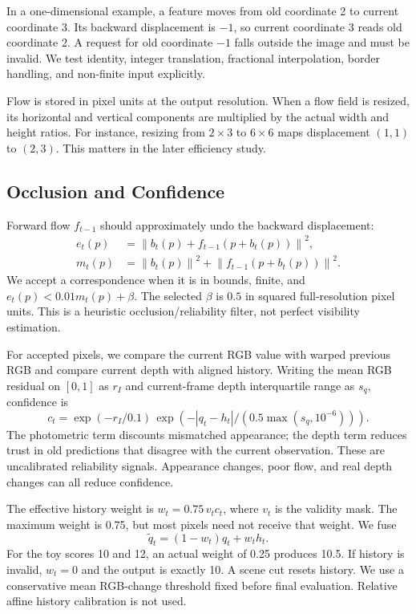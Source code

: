 \documentclass[10pt,twocolumn,letterpaper]{article}
\begin{document}
In a one-dimensional example, a feature moves from old coordinate 2 to current coordinate 3. Its backward displacement is $-1$, so current coordinate 3 reads old coordinate 2. A request for old coordinate $-1$ falls outside the image and must be invalid. We test identity, integer translation, fractional interpolation, border handling, and non-finite input explicitly.

Flow is stored in pixel units at the output resolution. When a flow field is resized, its horizontal and vertical components are multiplied by the actual width and height ratios. For instance, resizing from $2\times3$ to $6\times6$ maps displacement $(1,1)$ to $(2,3)$. This matters in the later efficiency study.

\subsection{Occlusion and Confidence}
Forward flow $f_{t-1}$ should approximately undo the backward displacement:
\begin{align}
e_t(p)&=\left\|b_t(p)+f_{t-1}(p+b_t(p))\right\|^2,\\
m_t(p)&=\left\|b_t(p)\right\|^2+
\left\|f_{t-1}(p+b_t(p))\right\|^2.
\end{align}
We accept a correspondence when it is in bounds, finite, and $e_t(p)<0.01m_t(p)+\beta$. The selected $\beta$ is $0.5$ in squared full-resolution pixel units. This is a heuristic occlusion/reliability filter, not perfect visibility estimation.

For accepted pixels, we compare the current RGB value with warped previous RGB and compare current depth with aligned history. Writing the mean RGB residual on $[0,1]$ as $r_I$ and current-frame depth interquartile range as $s_q$, confidence is
\begin{equation}
c_t=\exp(-r_I/0.1)\,
\exp\left(-|q_t-h_t|/(0.5\max(s_q,10^{-6}))\right).
\end{equation}
The photometric term discounts mismatched appearance; the depth term reduces trust in old predictions that disagree with the current observation. These are uncalibrated reliability signals. Appearance changes, poor flow, and real depth changes can all reduce confidence.

The effective history weight is $w_t=0.75\,v_t c_t$, where $v_t$ is the validity mask. The maximum weight is 0.75, but most pixels need not receive that weight. We fuse
\begin{equation}
\widetilde q_t=(1-w_t)q_t+w_t h_t.
\end{equation}
For the toy scores 10 and 12, an actual weight of 0.25 produces 10.5. If history is invalid, $w_t=0$ and the output is exactly 10. A scene cut resets history. We use a conservative mean RGB-change threshold fixed before final evaluation. Relative affine history calibration is not used.
\end{document}
